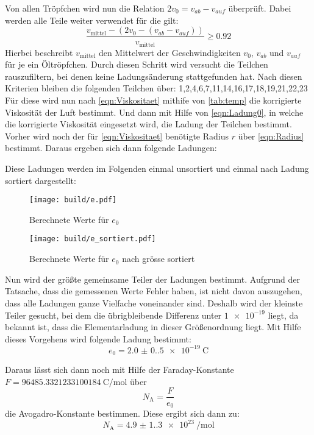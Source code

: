Von allen Tröpfchen wird nun die Relation $2v_0=v_{ab}-v_{auf}$ überprüft. Dabei werden alle Teile weiter verwendet für die gilt:
\begin{equation*}
    \frac{v_\text{mittel} - (2v_0 - (v_{ab}-v_{auf}))}{v_\text{mittel}} \geq \num{0.92}
\end{equation*}
Hierbei beschreibt $v_\text{mittel}$ den Mittelwert der Geschwindigkeiten $v_0$, $v_{ab}$ und  $v_{auf}$ für je ein Öltröpfchen. Durch diesen Schritt wird versucht die Teilchen rauszufiltern, bei denen keine Ladungsänderung stattgefunden hat.
Nach diesen Kriterien bleiben die folgenden Teilchen über: 1,2,4,6,7,11,14,16,17,18,19,21,22,23
Für diese wird nun nach \autoref{eqn:Viskositaet} mithife von \autoref{tab:temp} die korrigierte Viskosität der Luft bestimmt. Und dann mit Hilfe von \autoref{eqn:Ladung0}, in welche die korrigierte Viskosität eingesetzt wird, die Ladung der Teilchen bestimmt. Vorher wird noch der für \autoref{eqn:Viskositaet} benötigte Radius $r$ über \autoref{eqn:Radius} bestimmt. Daraus ergeben sich dann folgende Ladungen:

Diese Ladungen werden im Folgenden einmal unsortiert und einmal nach Ladung sortiert dargestellt:

\begin{figure}
    \centering
    \texttt{[image: build/e.pdf]}
    \caption{Berechnete Werte für $e_0$}
    \label{fig:e}
\end{figure}

\begin{figure}
    \centering
    \texttt{[image: build/e\_sortiert.pdf]}
    \caption{Berechnete Werte für $e_0$ nach grösse sortiert}
    \label{fig:e_sortiert}
\end{figure}

Nun wird der größte gemeinsame Teiler der Ladungen bestimmt. Aufgrund der Tatsache, dass die gemessenen Werte Fehler haben, ist nicht davon auszugehen, dass alle Ladungen ganze Vielfache voneinander sind.
Deshalb wird der kleinste Teiler gesucht, bei dem die übrigbleibende Differenz unter $\num{1e-19}$ liegt, da bekannt ist, dass die Elementarladung in dieser Größenordnung liegt.
Mit Hilfe dieses Vorgehens wird folgende Ladung  bestimmt:
\begin{equation*}
    e_0 = \qty{2.0(0.5)e-19}{\coulomb}
\end{equation*}

Daraus lässt sich dann noch mit Hilfe der Faraday-Konstante $F = \qty{96485.3321233100184}{\coulomb\per\mole}$ \cite[575]{Metzler}  über
\begin{equation*}
    N_\text{A} = \frac{F}{e_0}
\end{equation*}
die Avogadro-Konstante bestimmen. Diese ergibt sich dann zu:
\begin{equation*}
    N_\text{A} = \qty{4.9(1.3)e+23}{\per\mole}
\end{equation*}